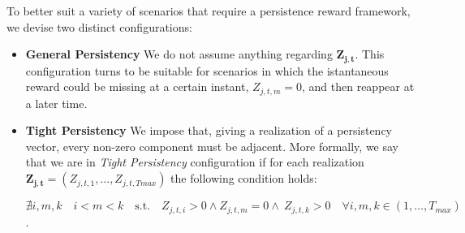 To better suit a variety of scenarios that require a persistence reward framework, we devise two distinct configurations:
\begin{itemize}
	\item \textbf{General Persistency} We do not assume anything regarding $\boldsymbol{Z_{j,t}}$. This configuration turns to be suitable for scenarios in which the istantaneous reward could be missing at a certain instant, $Z_{j,t,m} =0$, and then reappear at a later time. 
	
	\item \textbf{Tight Persistency} We impose that, giving a realization of a persistency vector, every non-zero component must be adjacent. More formally, we say that we are in \emph{Tight Persistency} configuration if for each realization $\boldsymbol{Z_{j,t}}= (Z_{j,t,1},\dots, Z_{j,t,Tmax})$ the following condition holds:
	\begin{center}
		$\nexists i,m,k  \quad i<m<k\quad \text{s.t.}\quad Z_{j,t,i}>0 \wedge Z_{j,t,m}=0 \wedge \ Z_{j,t,k}>0 \quad \forall i,m,k 	\in (1,\dots,T_{max})$.
	\end{center}
\end{itemize}







